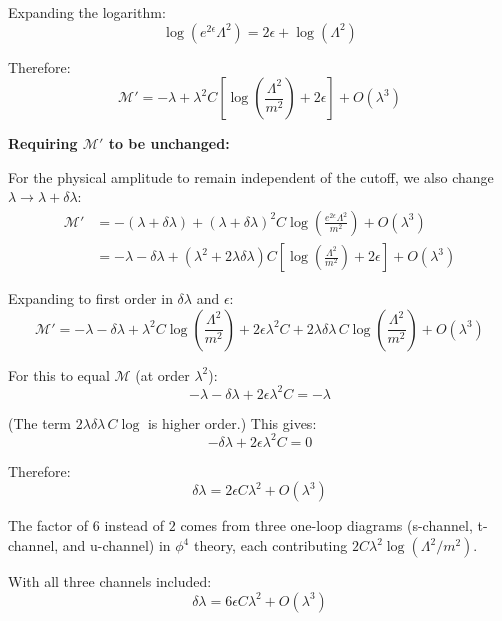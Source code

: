 \documentclass[12pt]{article}
\begin{document}
Expanding the logarithm:
\begin{equation}
\log(e^{2\epsilon}\Lambda^2) = 2\epsilon + \log(\Lambda^2)
\end{equation}

Therefore:
\begin{equation}
\mathcal{M}' = -\lambda + \lambda^2 C \left[\log\left(\frac{\Lambda^2}{m^2}\right) + 2\epsilon\right] + O(\lambda^3)
\end{equation}

\textbf{Requiring $\mathcal{M}'$ to be unchanged:}

For the physical amplitude to remain independent of the cutoff, we also change $\lambda \to \lambda + \delta\lambda$:
\begin{align}
\mathcal{M}' &= -(\lambda + \delta\lambda) + (\lambda + \delta\lambda)^2 C \log\left(\frac{e^{2\epsilon}\Lambda^2}{m^2}\right) + O(\lambda^3) \\
&= -\lambda - \delta\lambda + (\lambda^2 + 2\lambda\delta\lambda) C \left[\log\left(\frac{\Lambda^2}{m^2}\right) + 2\epsilon\right] + O(\lambda^3)
\end{align}

Expanding to first order in $\delta\lambda$ and $\epsilon$:
\begin{equation}
\mathcal{M}' = -\lambda - \delta\lambda + \lambda^2 C \log\left(\frac{\Lambda^2}{m^2}\right) + 2\epsilon\lambda^2 C + 2\lambda\delta\lambda \, C \log\left(\frac{\Lambda^2}{m^2}\right) + O(\lambda^3)
\end{equation}

For this to equal $\mathcal{M}$ (at order $\lambda^2$):
\begin{equation}
-\lambda - \delta\lambda + 2\epsilon\lambda^2 C = -\lambda
\end{equation}

(The term $2\lambda\delta\lambda \, C \log$ is higher order.) This gives:
\begin{equation}
-\delta\lambda + 2\epsilon\lambda^2 C = 0
\end{equation}

Therefore:
\begin{equation}
\delta\lambda = 2\epsilon C\lambda^2 + O(\lambda^3)
\end{equation}

The factor of $6$ instead of $2$ comes from three one-loop diagrams (s-channel, t-channel, and u-channel) in $\phi^4$ theory, each contributing $2C\lambda^2 \log(\Lambda^2/m^2)$.

With all three channels included:
\begin{equation}
\delta\lambda = 6\epsilon C\lambda^2 + O(\lambda^3)
\end{equation}
\end{document}
